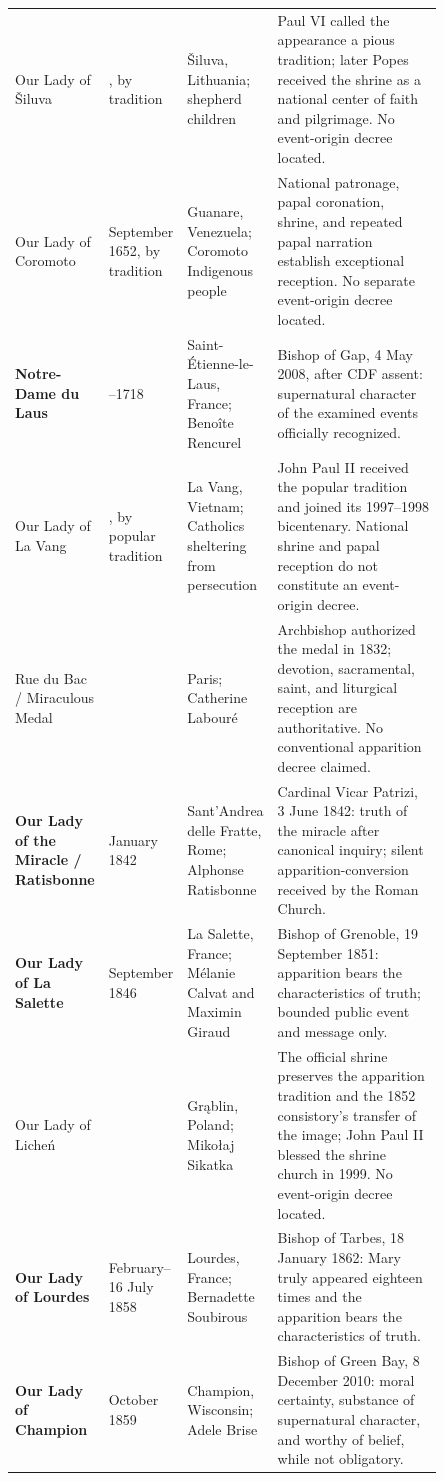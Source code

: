 \begin{longtable}{>{\raggedright\arraybackslash}p{0.145\linewidth}>{\raggedright\arraybackslash}p{0.115\linewidth}>{\raggedright\arraybackslash}p{0.17\linewidth}>{\raggedright\arraybackslash}p{0.42\linewidth}}
Our Lady of Šiluva & 1608, by tradition & Šiluva, Lithuania; shepherd children & Paul VI called the appearance a pious tradition; later Popes received the shrine as a national center of faith and pilgrimage. No event-origin decree located.\\
Our Lady of Coromoto & 8 September 1652, by tradition & Guanare, Venezuela; Coromoto Indigenous people & National patronage, papal coronation, shrine, and repeated papal narration establish exceptional reception. No separate event-origin decree located.\\
\textbf{Notre-Dame du Laus} & 1664--1718 & Saint-Étienne-le-Laus, France; Benoîte Rencurel & Bishop of Gap, 4 May 2008, after CDF assent: supernatural character of the examined events officially recognized.\\
Our Lady of La Vang & 1798, by popular tradition & La Vang, Vietnam; Catholics sheltering from persecution & John Paul II received the popular tradition and joined its 1997--1998 bicentenary. National shrine and papal reception do not constitute an event-origin decree.\\
Rue du Bac / Miraculous Medal & 1830 & Paris; Catherine Labouré & Archbishop authorized the medal in 1832; devotion, sacramental, saint, and liturgical reception are authoritative. No conventional apparition decree claimed.\\
\textbf{Our Lady of the Miracle / Ratisbonne} & 20 January 1842 & Sant'Andrea delle Fratte, Rome; Alphonse Ratisbonne & Cardinal Vicar Patrizi, 3 June 1842: truth of the miracle after canonical inquiry; silent apparition-conversion received by the Roman Church.\\
\textbf{Our Lady of La Salette} & 19 September 1846 & La Salette, France; Mélanie Calvat and Maximin Giraud & Bishop of Grenoble, 19 September 1851: apparition bears the characteristics of truth; bounded public event and message only.\\
Our Lady of Licheń & 1850 & Grąblin, Poland; Mikołaj Sikatka & The official shrine preserves the apparition tradition and the 1852 consistory's transfer of the image; John Paul II blessed the shrine church in 1999. No event-origin decree located.\\
\textbf{Our Lady of Lourdes} & 11 February--16 July 1858 & Lourdes, France; Bernadette Soubirous & Bishop of Tarbes, 18 January 1862: Mary truly appeared eighteen times and the apparition bears the characteristics of truth.\\
\textbf{Our Lady of Champion} & October 1859 & Champion, Wisconsin; Adele Brise & Bishop of Green Bay, 8 December 2010: moral certainty, substance of supernatural character, and worthy of belief, while not obligatory.\\

\end{longtable}
